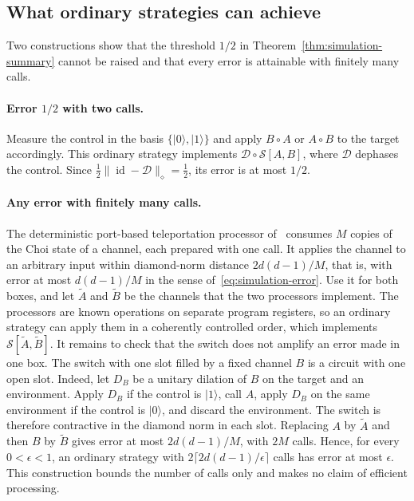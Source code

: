 \documentclass[11pt,letterpaper]{article}
\theoremstyle{definition}\newtheorem{definition}[theorem]{Definition}
\newcommand{\ket}[1]{\lvert#1\rangle}
\newcommand{\norm}[1]{\lVert#1\rVert}
\newcommand{\SW}{\mathcal S}
\newcommand{\id}{\operatorname{id}}
\begin{document}
\subsection{What ordinary strategies can achieve}\label{sec:simulation}

Two constructions show that the threshold $1/2$ in
Theorem~\ref{thm:simulation-summary} cannot be raised and that every
error is attainable with finitely many calls.

\paragraph{Error $1/2$ with two calls.}
Measure the control in the basis $\{\ket0,\ket1\}$ and apply $B\circ A$
or $A\circ B$ to the target accordingly. This ordinary strategy
implements $\mathcal D\circ\SW[A,B]$, where $\mathcal D$ dephases the
control. Since $\frac12\norm{\id-\mathcal D}_\diamond=\frac12$, its
error is at most $1/2$.

\paragraph{Any error with finitely many calls.}
The deterministic port-based teleportation processor
of~\cite{pirandola2019} consumes $M$ copies of the Choi state of a
channel, each prepared with one call. It applies the channel to an
arbitrary input within diamond-norm distance $2d(d-1)/M$, that is, with
error at most $d(d-1)/M$ in the sense
of~\eqref{eq:simulation-error}. Use it for both boxes, and let $\tilde A$ and $\tilde B$ be the
channels that the two processors implement. The processors are known
operations on separate program registers, so an ordinary strategy can
apply them in a coherently controlled order, which implements
$\SW[\tilde A,\tilde B]$. It remains to check that the switch does not
amplify an error made in one box. The switch with one slot filled by a
fixed channel $B$ is a circuit with one open slot. Indeed, let $D_B$ be a unitary dilation of $B$ on the
target and an environment. Apply $D_B$ if the control is $\ket1$, call
$A$, apply $D_B$ on the same environment if the control is $\ket0$, and
discard the environment. The switch is therefore contractive in the
diamond norm in each slot. Replacing $A$ by $\tilde A$ and then $B$ by
$\tilde B$ gives error at most $2d(d-1)/M$, with $2M$ calls.
Hence, for every $0<\epsilon<1$, an ordinary strategy with
$2\lceil2d(d-1)/\epsilon\rceil$ calls has error at most $\epsilon$.
This construction bounds the number of calls only and makes no claim of
efficient processing.
\end{document}
